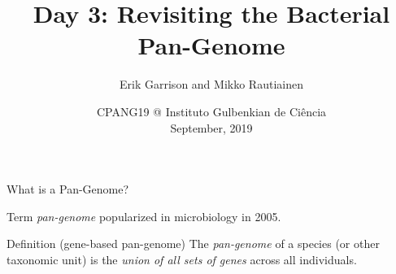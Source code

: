 \documentclass[notes=hide]{beamer}
\title{Day 3: Revisiting the Bacterial Pan-Genome}
\author[TM]{Erik Garrison and Mikko Rautiainen}
\date{CPANG19 @ Instituto Gulbenkian de Ci\^{e}ncia\\ September, 2019}
\newcommand{\0}{\ensuremath{\mathtt{0}}}
\newcommand{\1}{\ensuremath{\mathtt{1}}}
\begin{document}
\frame[plain]{\titlepage}



\begin{frame}[label=pangenomics]{What is a Pan-Genome?}
\begin{block}{}
Term \emph{pan-genome} popularized in microbiology in 2005.
\end{block}
\begin{block}{Definition (gene-based pan-genome)}
The \emph{pan-genome} of a species (or other taxonomic unit) is the \emph{union of all sets of genes} across all individuals.
\end{block}
\end{frame}
\end{document}

